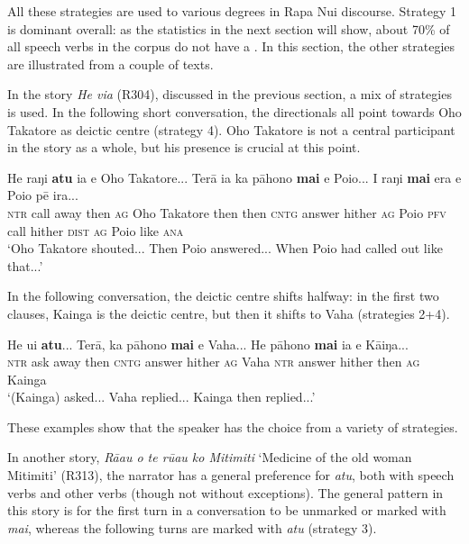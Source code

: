 All these strategies are used to various degrees in Rapa Nui discourse. Strategy 1 is dominant overall: as the statistics in the next section will show, about 70\% of all speech verbs in the corpus do not have a . In this section, the other strategies are illustrated from a couple of texts.

In the story \textit{He via} (R304), discussed in the previous section, a mix of strategies is used. In the following short conversation, the directionals all point towards Oho Takatore as deictic centre (strategy 4). Oho Takatore is not a central participant in the story as a whole, but his presence is crucial at this point.

\ea\label{ex:7.140}
\gll He raŋi \textbf{atu} ia e {\ꞌ}Oho Takatore... Terā ia ka pāhono \textbf{mai} e Poio... I raŋi \textbf{mai} era e Poio pē ira...\\
\textsc{ntr} call away then \textsc{ag} Oho Takatore then then \textsc{cntg} answer hither \textsc{ag} Poio \textsc{pfv} call hither \textsc{dist} \textsc{ag} Poio like \textsc{ana}\\

\glt
‘Oho Takatore shouted... Then Poio answered... When Poio had called out like that...’ \textstyleExampleref{[R304.058-063]}
\z

In the following conversation, the deictic centre shifts halfway: in the first two clauses, Kainga is the deictic centre, but then it shifts to Vaha (strategies 2+4). 

\ea\label{ex:7.141}
\gll He {\ꞌ}ui \textbf{atu}... Terā, ka pāhono \textbf{mai} e Vaha... He pāhono \textbf{mai} ia e Kāiŋa...\\
\textsc{ntr} ask away then \textsc{cntg} answer hither \textsc{ag} Vaha \textsc{ntr} answer hither then \textsc{ag} Kainga\\

\glt
‘(Kainga) asked... Vaha replied... Kainga then replied...’ \textstyleExampleref{[R304.096]} 
\z

These examples show that the speaker has the choice from a variety of strategies.

In another story, \textit{Rā{\ꞌ}au o te rū{\ꞌ}au ko Mitimiti} ‘Medicine of the old woman Mitimiti’ (R313), the narrator has a general preference for \textit{atu}, both with speech verbs and other verbs (though not without exceptions). The general pattern in this story is for the first turn in a conversation to be unmarked or marked with \textit{mai}, whereas the following turns are marked with \textit{atu} (strategy 3).

